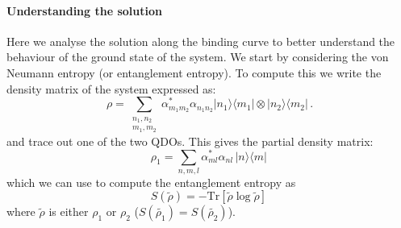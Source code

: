 \documentclass[reprint, amsmath, amssymb, floatfix, aps, pra]{revtex4-2}
\begin{document}
\paragraph*{Understanding the solution}
Here we analyse the solution along the binding curve to better understand the behaviour of the ground state of the system. We start by considering the von Neumann entropy (or entanglement entropy). To compute this we write the density matrix of the system expressed as:
\begin{equation*}
        \rho = \sum_{\substack{n_1,n_2 \\ m_1,m_2}} \alpha^*_{m_1m_2}\alpha_{n_1n_2}|n_1\rangle\langle m_1|\otimes|n_2\rangle\langle m_2|\,.
\end{equation*}
and trace out one of the two QDOs. This gives the partial density matrix:
\begin{equation*}
        \rho_1 = \sum_{n, m, l} \alpha^*_{ml}\alpha_{nl}\,|n\rangle\langle m|\,
\end{equation*}
which we can use to compute the entanglement entropy as
\begin{equation*}
    S(\tilde{\rho}) = -\text{Tr}\left[\tilde{\rho}\log\tilde{\rho}\right]\,
\end{equation*}
where $\tilde{\rho}$ is either $\rho_1$ or $\rho_2$ ($S(\tilde{\rho_1}) = S(\tilde{\rho_2})$).
\end{document}
